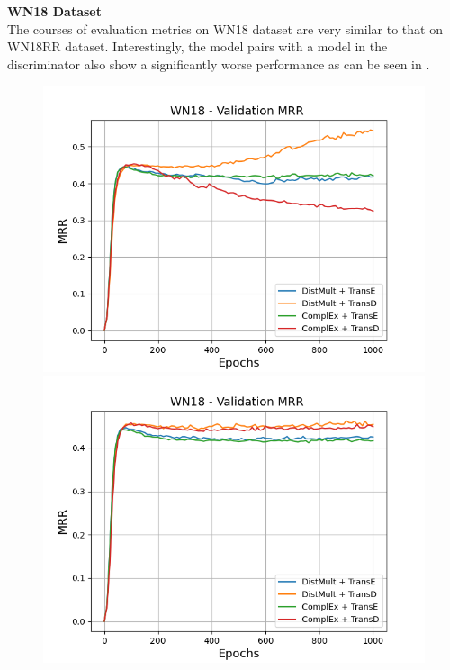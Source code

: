 \textbf{WN18 Dataset} 
\label{subsubsec:methods_wn18}\\
%
The courses of evaluation metrics on \textsc{WN18} dataset are very similar to that on \textsc{WN18RR} dataset.
Interestingly, the model pairs with a \transd model in the discriminator also show a significantly worse performance as can be seen in .
\begin{figure}[H]
    \centering
    \begin{minipage}{.5\textwidth}
      \centering
      \includegraphics[width=0.9\linewidth]{figures/results/gan_train/not_pretrained/uncertainty/max/entropy/wn18/1k_epochs/uncertainty_wn18_mrrs.png}
    \end{minipage}%
    \begin{minipage}{.5\textwidth}
      \centering
      \includegraphics[width=0.9\linewidth]{figures/results/gan_train/not_pretrained/uncertainty/max_distribution/entropy/wn18/1k_epochs/uncertainty_wn18_mrrs.png}

\end{minipage}
\end{figure}
